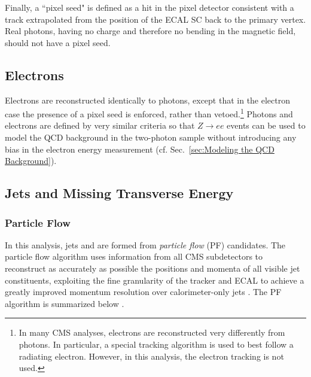 \documentclass[dissertation.tex]{subfiles}
\begin{document}
Finally, a ``pixel seed" is defined as a hit in the pixel detector consistent with a track extrapolated from the position of the ECAL SC back to the primary vertex.  Real photons, having no charge and therefore no bending in the magnetic field, should not have a pixel seed.

\subsection{Electrons}
\label{sec:Electrons}

Electrons are reconstructed identically to photons, except that in the electron case the presence of a pixel seed is enforced, rather than vetoed.\footnote{In many CMS analyses, electrons are reconstructed very differently from photons.  In particular, a special tracking algorithm \cite{GSF_reco} is used to best follow a radiating electron.  However, in this analysis, the electron tracking is not used.}  Photons and electrons are defined by very similar criteria so that $Z\rightarrow ee$ events can be used to model the QCD background in the two-photon sample without introducing any bias in the electron energy measurement (cf. Sec.~\ref{sec:Modeling the QCD Background}).

\subsection{Jets and Missing Transverse Energy}
\label{sec:Jets and Missing Transverse Energy}

\subsubsection{Particle Flow}
\label{sec:Particle Flow}

In this analysis, jets and \MET are formed from \textit{particle flow} (PF) candidates.  The particle flow algorithm \cite{PF_algo, PF_perf} uses information from all CMS subdetectors to reconstruct as accurately as possible the positions and momenta of all visible jet constituents, exploiting the fine granularity of the tracker and ECAL to achieve a greatly improved momentum resolution over calorimeter-only jets \cite{CMS_JES_paper}.  The PF algorithm is summarized below \cite{PF_note}.
\end{document}
